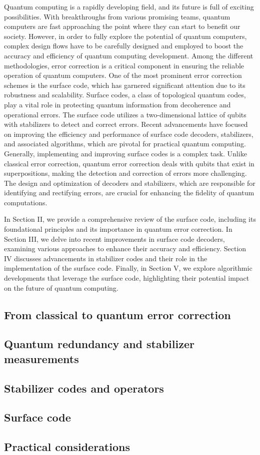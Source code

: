 Quantum computing is a rapidly developing field, and its future is full of exciting possibilities. With breakthroughs from various promising teams, quantum computers are fast approaching the point where they can start to benefit our society. However, in order to fully explore the potential of quantum computers, complex design flows have to be carefully designed and employed to boost the accuracy and efficiency of quantum computing development. Among the different methodologies, error correction is a critical component in ensuring the reliable operation of quantum computers. One of the most prominent error correction schemes is the surface code, which has garnered significant attention due to its robustness and scalability. Surface codes, a class of topological quantum codes, play a vital role in protecting quantum information from decoherence and operational errors. The surface code utilizes a two-dimensional lattice of qubits with stabilizers to detect and correct errors. Recent advancements have focused on improving the efficiency and performance of surface code decoders, stabilizers, and associated algorithms, which are pivotal for practical quantum computing. Generally, implementing and improving surface codes is a complex task. Unlike classical error correction, quantum error correction deals with qubits that exist in superpositions, making the detection and correction of errors more challenging. The design and optimization of decoders and stabilizers, which are responsible for identifying and rectifying errors, are crucial for enhancing the fidelity of quantum computations.

In Section II, we provide a comprehensive review of the surface code, including its foundational principles and its importance in quantum error correction. In Section III, we delve into recent improvements in surface code decoders, examining various approaches to enhance their accuracy and efficiency. Section IV discusses advancements in stabilizer codes and their role in the implementation of the surface code. Finally, in Section V, we explore algorithmic developments that leverage the surface code, highlighting their potential impact on the future of quantum computing.

\subsection{From classical to quantum error correction}


\subsection{Quantum redundancy and stabilizer measurements}


\subsection{Stabilizer codes and operators}


\subsection{Surface code}


\subsection{Practical considerations}
